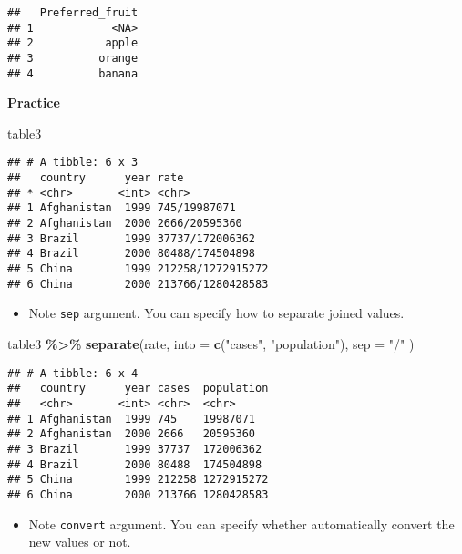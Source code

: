 \documentclass[
]{book}
\newenvironment{Shaded}{\begin{snugshade}}{\end{snugshade}}
\newcommand{\DataTypeTok}[1]{\textcolor[rgb]{0.13,0.29,0.53}{#1}}
\newcommand{\KeywordTok}[1]{\textcolor[rgb]{0.13,0.29,0.53}{\textbf{#1}}}
\newcommand{\NormalTok}[1]{#1}
\newcommand{\OperatorTok}[1]{\textcolor[rgb]{0.81,0.36,0.00}{\textbf{#1}}}
\newcommand{\StringTok}[1]{\textcolor[rgb]{0.31,0.60,0.02}{#1}}
\providecommand{\tightlist}{%
  \setlength{\itemsep}{0pt}\setlength{\parskip}{0pt}}
\begin{document}
\begin{verbatim}
##   Preferred_fruit
## 1            <NA>
## 2           apple
## 3          orange
## 4          banana
\end{verbatim}

\textbf{Practice}

\begin{Shaded}
\begin{Highlighting}[]
\NormalTok{table3}
\end{Highlighting}
\end{Shaded}

\begin{verbatim}
## # A tibble: 6 x 3
##   country      year rate             
## * <chr>       <int> <chr>            
## 1 Afghanistan  1999 745/19987071     
## 2 Afghanistan  2000 2666/20595360    
## 3 Brazil       1999 37737/172006362  
## 4 Brazil       2000 80488/174504898  
## 5 China        1999 212258/1272915272
## 6 China        2000 213766/1280428583
\end{verbatim}

\begin{itemize}
\tightlist
\item
  Note \texttt{sep} argument. You can specify how to separate joined values.
\end{itemize}

\begin{Shaded}
\begin{Highlighting}[]
\NormalTok{table3 }\OperatorTok{\%\textgreater{}\%}
\StringTok{  }\KeywordTok{separate}\NormalTok{(rate,}
    \DataTypeTok{into =} \KeywordTok{c}\NormalTok{(}\StringTok{"cases"}\NormalTok{, }\StringTok{"population"}\NormalTok{),}
    \DataTypeTok{sep =} \StringTok{"/"}
\NormalTok{  )}
\end{Highlighting}
\end{Shaded}

\begin{verbatim}
## # A tibble: 6 x 4
##   country      year cases  population
##   <chr>       <int> <chr>  <chr>     
## 1 Afghanistan  1999 745    19987071  
## 2 Afghanistan  2000 2666   20595360  
## 3 Brazil       1999 37737  172006362 
## 4 Brazil       2000 80488  174504898 
## 5 China        1999 212258 1272915272
## 6 China        2000 213766 1280428583
\end{verbatim}

\begin{itemize}
\tightlist
\item
  Note \texttt{convert} argument. You can specify whether automatically convert the new values or not.
\end{itemize}
\end{document}
